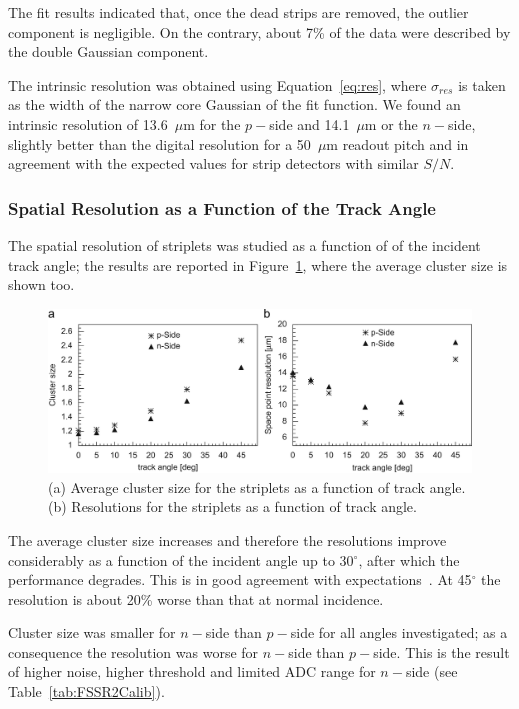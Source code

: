 The fit results indicated that, once the dead strips are removed, the outlier component is negligible. 
On the contrary, about 7\% of the data were described by the double Gaussian component.

The intrinsic resolution was obtained using Equation~\ref{eq:res}, where $\sigma_{res}$ is taken as 
the width of the narrow core Gaussian of the fit function. We found an intrinsic resolution of 
13.6~$\mu$m for the $p-$side and 14.1~$\mu$m or the $n-$side, slightly better than the digital 
resolution for a 50~$\mu$m readout pitch and in agreement with the expected values for strip detectors with similar $S/N$.

\subsubsection{Spatial Resolution as a Function of the Track Angle}

The spatial resolution of striplets was studied as a function of of the incident track angle; 
the results are reported in Figure~\ref{fig:cluster_rotation}, where the average cluster size 
is shown too.

\begin{figure}[!htbp]
\centering
\includegraphics[width=1.0\textwidth]{cluster_rotation.jpg}
\caption{\label{fig:cluster_rotation}(a) Average cluster size for the striplets as a function of track angle. (b) Resolutions for the striplets as a function of track angle.}
\end{figure}

The average cluster size increases and therefore the resolutions improve considerably as a function 
of the incident angle up to 30$^{\circ}$, after which the performance degrades. This is 
in good agreement with expectations~\cite{TURCHETTA}. At 45$^{\circ}$ the resolution is 
about 20\% worse than that at normal incidence. 

Cluster size was smaller for $n-$side than $p-$side for all angles investigated; as a consequence 
the resolution was worse for $n-$side than $p-$side. This is the result of higher noise, higher 
threshold and limited ADC range for $n-$side (see Table~\ref{tab:FSSR2Calib}).

